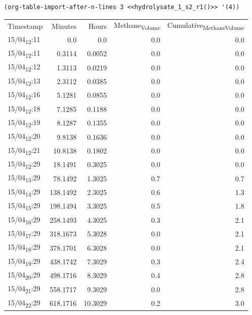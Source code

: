 \documentclass[11pt]{article}
\begin{document}
\begin{verbatim}
(org-table-import-after-n-lines 3 <<hydrolysate_1_s2_r1()>> '(4))
\end{verbatim}

\begin{center}
\begin{tabular}{lrrrr}
Timestamp & Minutes & Hours & Methane\textsubscript{Volume} & Cumulative\textsubscript{Methane}\textsubscript{Volume}\\[0pt]
15/04\textsubscript{12}:11 & 0.0 & 0.0 & 0.0 & 0.0\\[0pt]
15/04\textsubscript{12}:11 & 0.3114 & 0.0052 & 0.0 & 0.0\\[0pt]
15/04\textsubscript{12}:12 & 1.3113 & 0.0219 & 0.0 & 0.0\\[0pt]
15/04\textsubscript{12}:13 & 2.3112 & 0.0385 & 0.0 & 0.0\\[0pt]
15/04\textsubscript{12}:16 & 5.1281 & 0.0855 & 0.0 & 0.0\\[0pt]
15/04\textsubscript{12}:18 & 7.1285 & 0.1188 & 0.0 & 0.0\\[0pt]
15/04\textsubscript{12}:19 & 8.1287 & 0.1355 & 0.0 & 0.0\\[0pt]
15/04\textsubscript{12}:20 & 9.8138 & 0.1636 & 0.0 & 0.0\\[0pt]
15/04\textsubscript{12}:21 & 10.8138 & 0.1802 & 0.0 & 0.0\\[0pt]
15/04\textsubscript{12}:29 & 18.1491 & 0.3025 & 0.0 & 0.0\\[0pt]
15/04\textsubscript{13}:29 & 78.1492 & 1.3025 & 0.7 & 0.7\\[0pt]
15/04\textsubscript{14}:29 & 138.1492 & 2.3025 & 0.6 & 1.3\\[0pt]
15/04\textsubscript{15}:29 & 198.1494 & 3.3025 & 0.5 & 1.8\\[0pt]
15/04\textsubscript{16}:29 & 258.1493 & 4.3025 & 0.3 & 2.1\\[0pt]
15/04\textsubscript{17}:29 & 318.1673 & 5.3028 & 0.0 & 2.1\\[0pt]
15/04\textsubscript{18}:29 & 378.1701 & 6.3028 & 0.0 & 2.1\\[0pt]
15/04\textsubscript{19}:29 & 438.1742 & 7.3029 & 0.3 & 2.4\\[0pt]
15/04\textsubscript{20}:29 & 498.1716 & 8.3029 & 0.4 & 2.8\\[0pt]
15/04\textsubscript{21}:29 & 558.1717 & 9.3029 & 0.0 & 2.8\\[0pt]
15/04\textsubscript{22}:29 & 618.1716 & 10.3029 & 0.2 & 3.0\\[0pt]

\end{tabular}
\end{center}
\end{document}

